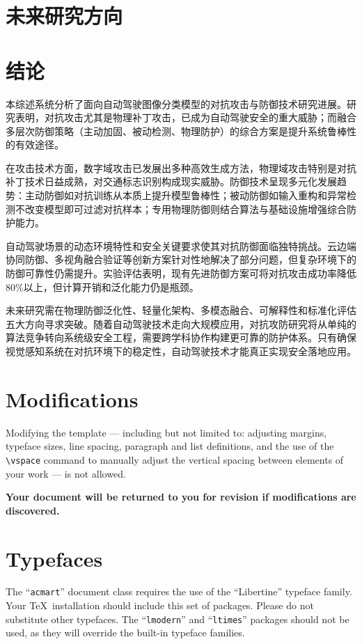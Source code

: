 \documentclass[acmtog]{ctexart}
\begin{document}
\section{未来研究方向}

\section{结论}

本综述系统分析了面向自动驾驶图像分类模型的对抗攻击与防御技术研究进展。研究表明，对抗攻击尤其是物理补丁攻击，已成为自动驾驶安全的重大威胁；而融合多层次防御策略（主动加固、被动检测、物理防护）的综合方案是提升系统鲁棒性的有效途径。

在攻击技术方面，数字域攻击已发展出多种高效生成方法，物理域攻击特别是对抗补丁技术日益成熟，对交通标志识别构成现实威胁。防御技术呈现多元化发展趋势：主动防御如对抗训练从本质上提升模型鲁棒性；被动防御如输入重构和异常检测不改变模型即可过滤对抗样本；专用物理防御则结合算法与基础设施增强综合防护能力。

自动驾驶场景的动态环境特性和安全关键要求使其对抗防御面临独特挑战。云边端协同防御、多视角融合验证等创新方案针对性地解决了部分问题，但复杂环境下的防御可靠性仍需提升。实验评估表明，现有先进防御方案可将对抗攻击成功率降低80\%以上，但计算开销和泛化能力仍是瓶颈。

未来研究需在物理防御泛化性、轻量化架构、多模态融合、可解释性和标准化评估五大方向寻求突破。随着自动驾驶技术走向大规模应用，对抗攻防研究将从单纯的算法竞争转向系统级安全工程，需要跨学科协作构建更可靠的防护体系。只有确保视觉感知系统在对抗环境下的稳定性，自动驾驶技术才能真正实现安全落地应用。

\section{Modifications}

Modifying the template --- including but not limited to: adjusting
margins, typeface sizes, line spacing, paragraph and list definitions,
and the use of the \verb|\vspace| command to manually adjust the
vertical spacing between elements of your work --- is not allowed.

{\bfseries Your document will be returned to you for revision if
  modifications are discovered.}

\section{Typefaces}

The ``\verb|acmart|'' document class requires the use of the
``Libertine'' typeface family. Your \TeX\ installation should include
this set of packages. Please do not substitute other typefaces. The
``\verb|lmodern|'' and ``\verb|ltimes|'' packages should not be used,
as they will override the built-in typeface families.
\end{document}
